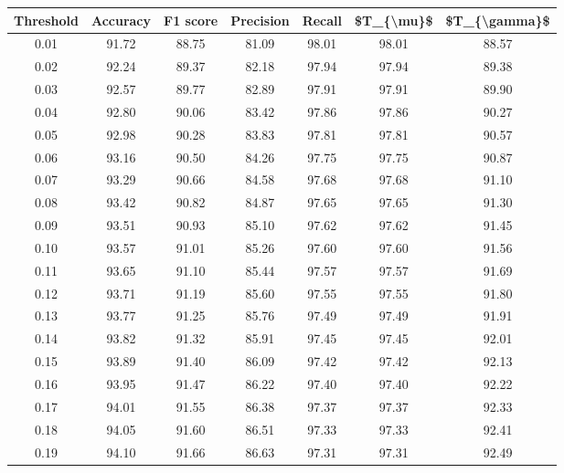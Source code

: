 \begin{tabular}{|c|c|c|c|c|c|c|}
\hline
 Threshold &  Accuracy &  F1 score &  Precision &  Recall &  \$T\_\{\textbackslash mu\}\$ &  \$T\_\{\textbackslash gamma\}\$ \\
\hline
      0.01 &     91.72 &     88.75 &      81.09 &   98.01 &      98.01 &         88.57 \\
      0.02 &     92.24 &     89.37 &      82.18 &   97.94 &      97.94 &         89.38 \\
      0.03 &     92.57 &     89.77 &      82.89 &   97.91 &      97.91 &         89.90 \\
      0.04 &     92.80 &     90.06 &      83.42 &   97.86 &      97.86 &         90.27 \\
      0.05 &     92.98 &     90.28 &      83.83 &   97.81 &      97.81 &         90.57 \\
      0.06 &     93.16 &     90.50 &      84.26 &   97.75 &      97.75 &         90.87 \\
      0.07 &     93.29 &     90.66 &      84.58 &   97.68 &      97.68 &         91.10 \\
      0.08 &     93.42 &     90.82 &      84.87 &   97.65 &      97.65 &         91.30 \\
      0.09 &     93.51 &     90.93 &      85.10 &   97.62 &      97.62 &         91.45 \\
      0.10 &     93.57 &     91.01 &      85.26 &   97.60 &      97.60 &         91.56 \\
      0.11 &     93.65 &     91.10 &      85.44 &   97.57 &      97.57 &         91.69 \\
      0.12 &     93.71 &     91.19 &      85.60 &   97.55 &      97.55 &         91.80 \\
      0.13 &     93.77 &     91.25 &      85.76 &   97.49 &      97.49 &         91.91 \\
      0.14 &     93.82 &     91.32 &      85.91 &   97.45 &      97.45 &         92.01 \\
      0.15 &     93.89 &     91.40 &      86.09 &   97.42 &      97.42 &         92.13 \\
      0.16 &     93.95 &     91.47 &      86.22 &   97.40 &      97.40 &         92.22 \\
      0.17 &     94.01 &     91.55 &      86.38 &   97.37 &      97.37 &         92.33 \\
      0.18 &     94.05 &     91.60 &      86.51 &   97.33 &      97.33 &         92.41 \\
      0.19 &     94.10 &     91.66 &      86.63 &   97.31 &      97.31 &         92.49 \\

\end{tabular}
